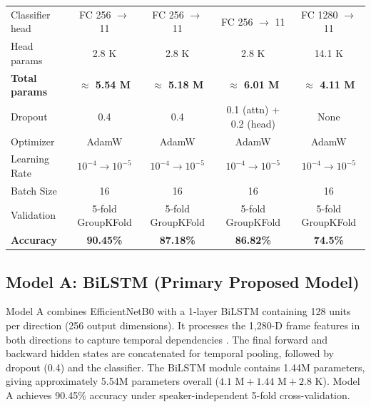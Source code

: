 \documentclass[journal]{IEEEtran}
\begin{document}
\begin{table}[!t]
\begin{tabular}{l|c|c|c|c}
        Classifier head       & FC 256 \(\to\) 11           & FC 256 \(\to\) 11           & FC 256 \(\to\) 11              & FC 1280 \(\to\) 11          \\
        Head params           & 2.8 K                       & 2.8 K                       & 2.8 K                          & 14.1 K                      \\
        \textbf{Total params} & \textbf{\(\approx\) 5.54 M} & \textbf{\(\approx\) 5.18 M} & \textbf{\(\approx\) 6.01 M}    & \textbf{\(\approx\) 4.11 M} \\
        Dropout               & 0.4                         & 0.4                         & 0.1 (attn) + 0.2 (head)        & None                        \\
        Optimizer             & AdamW                       & AdamW                       & AdamW                          & AdamW                       \\
        Learning Rate         & \(10^{-4} \to 10^{-5}\)     & \(10^{-4} \to 10^{-5}\)     & \(10^{-4} \to 10^{-5}\)        & \(10^{-4} \to 10^{-5}\)     \\
        Batch Size            & 16                          & 16                          & 16                             & 16                          \\
        Validation            & 5-fold GroupKFold           & 5-fold GroupKFold           & 5-fold GroupKFold              & 5-fold GroupKFold           \\
        \textbf{Accuracy}     & \textbf{90.45\%}             & \textbf{87.18\%}             & \textbf{86.82\%}                & \textbf{74.5\%}             \\
        \hline
    \end{tabular}
\end{table}

\subsection{Model A: BiLSTM (Primary Proposed Model)}

Model A combines EfficientNetB0 with a 1-layer BiLSTM containing 128 units per direction (256 output dimensions). It processes the 1,280-D frame features in both directions to capture temporal dependencies \cite{hochreiter1997long}. The final forward and backward hidden states are concatenated for temporal pooling, followed by dropout (0.4) and the classifier. The BiLSTM module contains 1.44M parameters, giving approximately 5.54M parameters overall ($4.1\text{ M} + 1.44\text{ M} + 2.8\text{ K}$). Model A achieves 90.45\% accuracy under speaker-independent 5-fold cross-validation.
\end{document}
